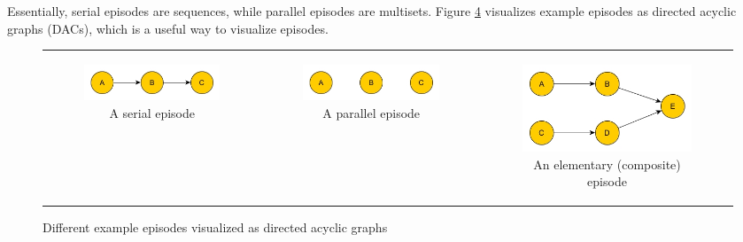Essentially, serial episodes are sequences, while parallel episodes are multisets. Figure \ref{fig_exampleEpisodes} visualizes example episodes as directed acyclic graphs (DACs), which is a useful way to visualize episodes. 


\begin{figure}[H]
\centering
\begin{tabular}{c|c|c}
\begin{subfigure}{.3\textwidth}
  \centering
  \includegraphics[width=\linewidth]{exampleSerialEpisode}
  \caption{A serial episode}
  \label{fig:sub1}
\end{subfigure}%
&
\begin{subfigure}{.3\textwidth}
  \centering
  \includegraphics[width=\linewidth]{exampleParallelEpisode}
  \caption{A parallel episode}
  \label{fig:sub2}
\end{subfigure}
&
\begin{subfigure}{.3\textwidth}
  \centering
  \includegraphics[width=\linewidth]{exampleCompositeEpisode}
  \caption{An elementary (composite) episode}
  \label{fig:sub3}
\end{subfigure}
\end{tabular}
\caption{Different example episodes visualized as directed acyclic graphs}
\label{fig_exampleEpisodes}

\end{figure}

